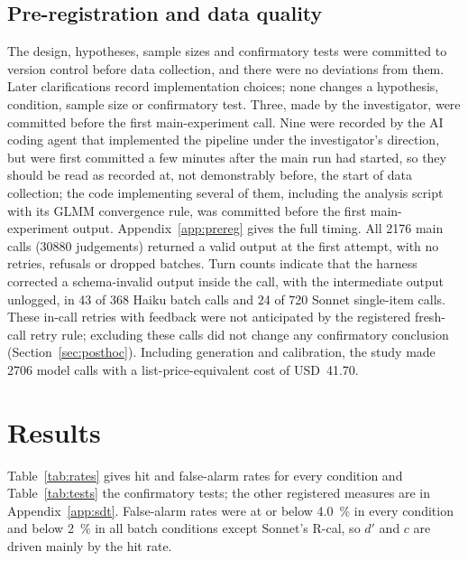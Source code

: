 \documentclass[10pt]{article}
\begin{document}
\subsection{Pre-registration and data quality}\label{sec:prereg}

The design, hypotheses, sample sizes and confirmatory tests were committed to version control before data collection, and there were no deviations from them. Later clarifications record implementation choices; none changes a hypothesis, condition, sample size or confirmatory test. Three, made by the investigator, were committed before the first main-experiment call. Nine were recorded by the AI coding agent that implemented the pipeline under the investigator's direction, but were first committed a few minutes after the main run had started, so they should be read as recorded at, not demonstrably before, the start of data collection; the code implementing several of them, including the analysis script with its GLMM convergence rule, was committed before the first main-experiment output. Appendix~\ref{app:prereg} gives the full timing. All \num{2176} main calls (\num{30880} judgements) returned a valid output at the first attempt, with no retries, refusals or dropped batches. Turn counts indicate that the harness corrected a schema-invalid output inside the call, with the intermediate output unlogged, in 43 of 368 Haiku batch calls and 24 of 720 Sonnet single-item calls. These in-call retries with feedback were not anticipated by the registered fresh-call retry rule; excluding these calls did not change any confirmatory conclusion (Section~\ref{sec:posthoc}). Including generation and calibration, the study made \num{2706} model calls with a list-price-equivalent cost of USD~41.70.

\section{Results}\label{sec:results}

Table~\ref{tab:rates} gives hit and false-alarm rates for every condition and Table~\ref{tab:tests} the confirmatory tests; the other registered measures are in Appendix~\ref{app:sdt}. False-alarm rates were at or below \SI{4.0}{\percent} in every condition and below \SI{2}{\percent} in all batch conditions except Sonnet's R-cal, so $d'$ and $c$ are driven mainly by the hit rate.
\end{document}
